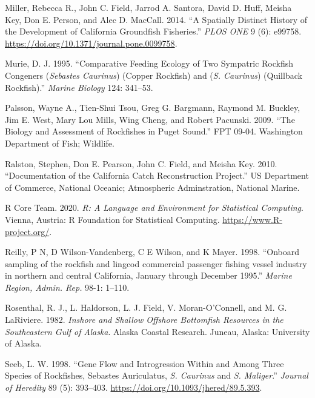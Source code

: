 \documentclass[11pt,
  english,
  a4paper,
]{article}
\begin{document}
\leavevmode\hypertarget{ref-Milleretal_2014}{}%
Miller, Rebecca R., John C. Field, Jarrod A. Santora, David D. Huff, Meisha Key, Don E. Person, and Alec D. MacCall. 2014. ``A Spatially Distinct History of the Development of California Groundfish Fisheries.'' \emph{PLOS ONE} 9 (6): e99758. \url{https://doi.org/10.1371/journal.pone.0099758}.

\leavevmode\hypertarget{ref-Murie_diet_1995}{}%
Murie, D. J. 1995. ``Comparative Feeding Ecology of Two Sympatric Rockfish Congeners (\emph{Sebastes Caurinus}) (Copper Rockfish) and (\emph{S. Caurinus}) (Quillback Rockfish).'' \emph{Marine Biology} 124: 341--53.

\leavevmode\hypertarget{ref-Palssonetal_2009}{}%
Palsson, Wayne A., Tien-Shui Tsou, Greg G. Bargmann, Raymond M. Buckley, Jim E. West, Mary Lou Mills, Wing Cheng, and Robert Pacunski. 2009. ``The Biology and Assessment of Rockfishes in Puget Sound.'' FPT 09-04. Washington Department of Fish; Wildlife.

\leavevmode\hypertarget{ref-ralston_documentation_2010}{}%
Ralston, Stephen, Don E. Pearson, John C. Field, and Meisha Key. 2010. ``Documentation of the California Catch Reconstruction Project.'' US Department of Commerce, National Oceanic; Atmospheric Adminstration, National Marine.

\leavevmode\hypertarget{ref-R_2020}{}%
R Core Team. 2020. \emph{R: A Language and Environment for Statistical Computing}. Vienna, Austria: R Foundation for Statistical Computing. \url{https://www.R-project.org/}.

\leavevmode\hypertarget{ref-Reilly1998}{}%
Reilly, P N, D Wilson-Vandenberg, C E Wilson, and K Mayer. 1998. ``Onboard sampling of the rockfish and lingcod commercial passenger fishing vessel industry in northern and central California, January through December 1995.'' \emph{Marine Region, Admin. Rep.} 98-1: 1--110.

\leavevmode\hypertarget{ref-Rosenthaletal_maturity_1982}{}%
Rosenthal, R. J., L. Haldorson, L. J. Field, V. Moran-O'Connell, and M. G. LaRiviere. 1982. \emph{Inshore and Shallow Offshore Bottomfish Resources in the Southeastern Gulf of Alaska}. Alaska Coastal Research. Juneau, Alaska: University of Alaska.

\leavevmode\hypertarget{ref-seeb_gene_1998}{}%
Seeb, L. W. 1998. ``Gene Flow and Introgression Within and Among Three Species of Rockfishes, Sebastes Auriculatus, \emph{S. Caurinus} and \emph{S. Maliger}.'' \emph{Journal of Heredity} 89 (5): 393--403. \url{https://doi.org/10.1093/jhered/89.5.393}.
\end{document}
